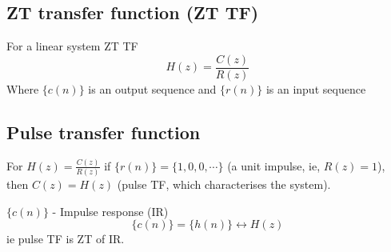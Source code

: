 \documentclass[11pt]{article} %
\theoremstyle{definition}
\begin{document}
\subsection{ZT transfer function (ZT TF)}
For a linear system ZT TF\begin{equation}
 H(z) = \frac{C(z)}{R(z)}
\end{equation}
Where $\{c(n)\}$ is an output sequence and  $\{r(n)\}$  is an input sequence

\subsection{Pulse transfer function}
For $H(z)=\frac{C(z)}{R(z)}$ if $\{r(n)\} = \{1,0,0,\cdots\}$ (a unit impulse, ie, $R(z)=1$), then $C(z)=H(z)$ (pulse TF, which characterises the system).

$\{c(n)\}$ - Impulse response (IR) 
\begin{equation}
	\{c(n)\} = \{h(n)\} \leftrightarrow H(z)
\end{equation}
 ie pulse TF is ZT of IR.
\end{document}
